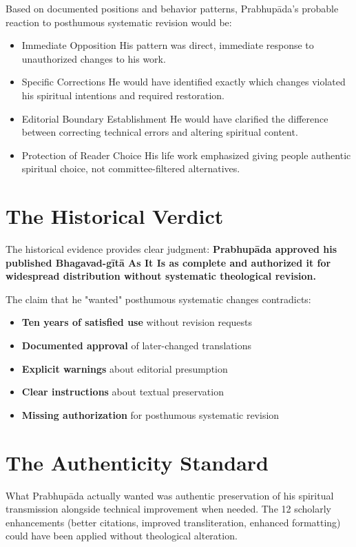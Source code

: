 \documentclass[11pt,twoside]{book}
\begin{document}
Based on documented positions and behavior patterns, Prabhupāda's probable reaction to posthumous systematic revision would be:
\begin{itemize}
\item Immediate Opposition
\label{sec:org502070c}
His pattern was direct, immediate response to unauthorized changes to his work.
\item Specific Corrections
\label{sec:org23026eb}
He would have identified exactly which changes violated his spiritual intentions and required restoration.
\item Editorial Boundary Establishment
\label{sec:orgb9c1ee1}
He would have clarified the difference between correcting technical errors and altering spiritual content.
\item Protection of Reader Choice
\label{sec:org3052fea}
His life work emphasized giving people authentic spiritual choice, not committee-filtered alternatives.
\end{itemize}
\section*{The Historical Verdict}
\label{sec:orgdebd56a}

The historical evidence provides clear judgment: \textbf{\textbf{Prabhupāda approved his published Bhagavad-gītā As It Is as complete and authorized it for widespread distribution without systematic theological revision.}}

The claim that he "wanted" posthumous systematic changes contradicts:
\begin{itemize}
\item \textbf{\textbf{Ten years of satisfied use}} without revision requests
\item \textbf{\textbf{Documented approval}} of later-changed translations
\item \textbf{\textbf{Explicit warnings}} about editorial presumption
\item \textbf{\textbf{Clear instructions}} about textual preservation
\item \textbf{\textbf{Missing authorization}} for posthumous systematic revision
\end{itemize}
\section*{The Authenticity Standard}
\label{sec:org2aa0f59}

What Prabhupāda actually wanted was authentic preservation of his spiritual transmission alongside technical improvement when needed. The 12 scholarly enhancements (better citations, improved transliteration, enhanced formatting) could have been applied without theological alteration.
\end{document}
